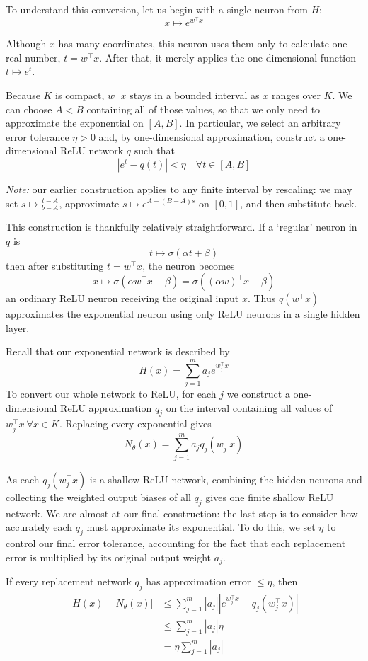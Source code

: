 \documentclass{article}
\theoremstyle{definition}
\newcommand{\note}{\textit{Note: }}
\begin{document}
To understand this conversion, let us begin with a single neuron from $H$:
$$x \mapsto e^{w^\top x}$$

Although $x$ has many coordinates, this neuron uses them only to calculate one real number, $t = w^\top x$. After that, it merely applies the one-dimensional function $t \mapsto e^t$.

Because $K$ is compact, $w^\top x$ stays in a bounded interval as $x$ ranges over $K$. We can choose $A < B$ containing all of those values, so that we only need to approximate the exponential on $[A, B]$. In particular, we select an arbitrary error tolerance $\eta > 0$ and, by one-dimensional approximation, construct a one-dimensional ReLU network $q$ such that
$$|e^t - q(t)| < \eta \quad \forall t \in [A, B]$$

\begin{aside}
\note our earlier construction applies to any finite interval by rescaling: we may set $s \mapsto \frac{t-A}{b-A}$, approximate $s \mapsto e^{A + (B-A)s}$ on $[0, 1]$, and then substitute back.
\end{aside}

This construction is thankfully relatively straightforward. If a `regular' neuron in $q$ is
$$t \mapsto \sigma(\alpha t + \beta)$$
then after substituting $t = w^\top x$, the neuron becomes
$$x \mapsto \sigma(\alpha w^\top x + \beta) = \sigma((\alpha w)^\top x + \beta)$$
an ordinary ReLU neuron receiving the original input $x$. Thus $q(w^\top x)$ approximates the exponential neuron using only ReLU neurons in a single hidden layer.

Recall that our exponential network is described by
$$H(x) = \sum_{j=1}^m a_je^{w^\top_j x}$$
To convert our whole network to ReLU, for each $j$ we construct a one-dimensional ReLU approximation $q_j$ on the interval containing all values of $w^\top_j x\ \forall x \in K$. Replacing every exponential gives
$$N_\theta(x) = \sum_{j=1}^m a_jq_j(w^\top_j x)$$

As each $q_j(w^\top_jx)$ is a shallow ReLU network, combining the hidden neurons and collecting the weighted output biases of all $q_j$ gives one finite shallow ReLU network. We are almost at our final construction: the last step is to consider how accurately each $q_j$ must approximate its exponential. To do this, we set $\eta$ to control our final error tolerance, accounting for the fact that each replacement error is multiplied by its original output weight $a_j$.

If every replacement network $q_j$ has approximation error $\le \eta$, then
\begin{align*}
    |H(x) - N_\theta(x)| &\le \sum_{j=1}^m|a_j||e^{w^\top_j x} - q_j(w^\top_j x)| \\
    &\le \sum_{j=1}^m |a_j| \eta \\
    &= \eta \sum_{j=1}^m |a_j|
\end{align*}
\end{document}
